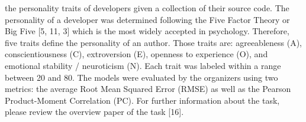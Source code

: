  the personality traits of developers given a collection of their source code. The personality of a developer was determined following the Five Factor Theory or Big Five [5, 11, 3] which is the most widely accepted in psychology. Therefore, five traits define the personality of an author. Those traits are: agreeableness (A), conscientiousness (C), extroversion (E), openness to experience (O), and emotional stability / neuroticism (N). Each trait was labeled within a range between 20 and 80. The models were evaluated by the organizers using two metrics: the average Root Mean Squared Error (RMSE) as well as the Pearson Product-Moment Correlation (PC). For further information about the task, please review the overview paper of the task [16].
